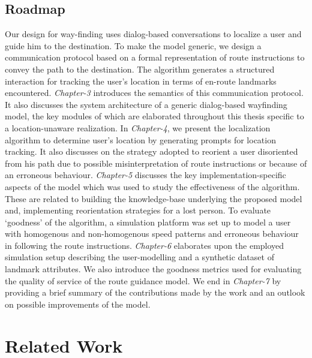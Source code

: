\documentclass{iitkthesis}
\begin{document}
  \section{Roadmap}
Our design for way-finding uses dialog-based conversations to localize a 
user and guide him to the destination. To make the model generic, we design 
a communication protocol based on a formal representation of route instructions
to convey the path to the destination. The algorithm generates
a structured interaction for tracking the user's 
location in terms of en-route landmarks encountered. 
\textit{Chapter-3} introduces the semantics of this communication protocol. It also discusses the system architecture of a generic dialog-based wayfinding model, the key modules of which are elaborated throughout this thesis specific to a location-unaware realization.
In \textit{Chapter-4}, we present the localization algorithm to determine user's location by generating prompts for location tracking. It also discusses on the strategy adopted to reorient a user disoriented from his path due to possible misinterpretation of route instructions or because of an erroneous behaviour. 
\textit{Chapter-5} discusses the key implementation-specific aspects of the model which was used to study the effectiveness of the algorithm. These are related to building the knowledge-base underlying the proposed model and, implementing reorientation strategies for a lost person. 
To evaluate `goodness' of the algorithm, a simulation platform was set up to model a user with homogenous and non-homogenous speed patterns and erroneous behaviour in following the route instructions. \textit{Chapter-6} elaborates upon the employed simulation setup describing the user-modelling and a synthetic dataset of landmark attributes. We also introduce the goodness metrics used for evaluating the quality of service of the route guidance model. We end in \textit{Chapter-7} by providing a brief summary of the contributions made by the work and an outlook on possible improvements of the model. 

 \chapter{Related Work}
\end{document}
